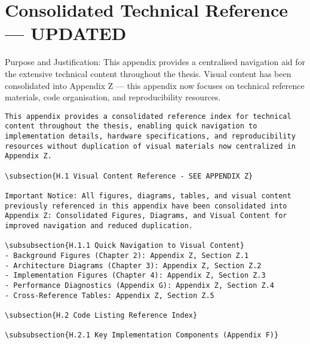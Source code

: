 \chapter{Consolidated Technical Reference — UPDATED}

Purpose and Justification: This appendix provides a centralised navigation aid for the extensive technical content throughout the thesis. Visual content has been consolidated into Appendix Z — this appendix now focuses on technical reference materials, code organisation, and reproducibility resources.


\begin{verbatim}
This appendix provides a consolidated reference index for technical content throughout the thesis, enabling quick navigation to implementation details, hardware specifications, and reproducibility resources without duplication of visual materials now centralized in Appendix Z.

\subsection{H.1 Visual Content Reference - SEE APPENDIX Z}

Important Notice: All figures, diagrams, tables, and visual content previously referenced in this appendix have been consolidated into Appendix Z: Consolidated Figures, Diagrams, and Visual Content for improved navigation and reduced duplication.

\subsubsection{H.1.1 Quick Navigation to Visual Content}
- Background Figures (Chapter 2): Appendix Z, Section Z.1
- Architecture Diagrams (Chapter 3): Appendix Z, Section Z.2
- Implementation Figures (Chapter 4): Appendix Z, Section Z.3
- Performance Diagnostics (Appendix G): Appendix Z, Section Z.4
- Cross-Reference Tables: Appendix Z, Section Z.5

\subsection{H.2 Code Listing Reference Index}

\subsubsection{H.2.1 Key Implementation Components (Appendix F)}


\end{verbatim}
